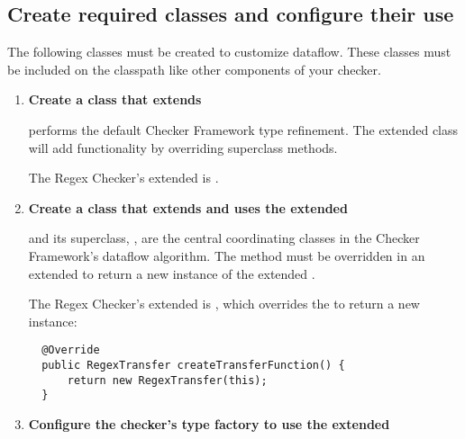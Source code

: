 \subsection{Create required classes and configure their
  use\label{dataflow-create-classes}}

The following classes must be created to customize dataflow. These classes must
be included on the classpath like other components of your checker.

\begin{enumerate}
\item \textbf{Create a class that extends
    }

   performs the default Checker
  Framework type refinement.  The extended class will add functionality by
  overriding superclass methods.

  The Regex Checker's extended  is
  .

\item \textbf{Create a class that extends
     and uses the extended
    }

   and its superclass,
  , are the central coordinating classes
  in the Checker Framework's dataflow algorithm. The
   method must be overridden in an extended
   to return a new instance of the
  extended .

  The Regex Checker's extended  is
  , which overrides the
   to return a new
   instance:

\begin{smaller}
\begin{Verbatim}
  @Override
  public RegexTransfer createTransferFunction() {
      return new RegexTransfer(this);
  }
\end{Verbatim}
\end{smaller}

\item \textbf{Configure the checker's type factory to use the extended
    }


\end{enumerate}
